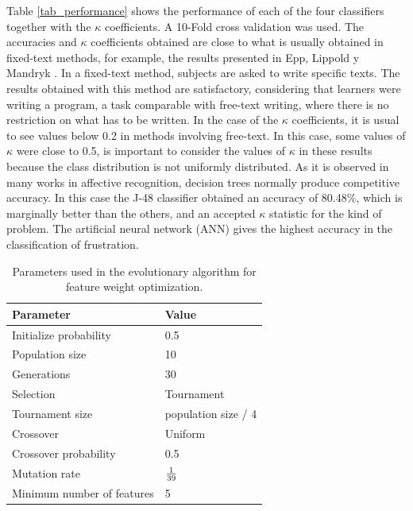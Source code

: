 \documentclass[a4paper,twoside]{article}
\begin{document}
Table \ref{tab_performance} shows the performance of each of the four
classifiers together
with the $\kappa$ coefficients. A 10-Fold cross validation was used.
The accuracies and $\kappa$ coefficients obtained are close to what is
usually obtained in fixed-text methods, for example, the results presented in
Epp, Lippold y Mandryk \cite{epp2011identifying}.
In a fixed-text method, subjects are asked to write specific texts.
The results obtained with this method are satisfactory, considering that
learners were writing a program, a task comparable with free-text writing,
where there is no restriction on what has to be written.
In the case of the $\kappa$ coefficients, it is
usual to see values below 0.2 in methods involving free-text. In this case, some
values of $\kappa$ were close to 0.5, is important to consider the values of $\kappa$
in these results because the class distribution is not uniformly distributed. As
it is observed in many works in affective recognition, decision trees normally
produce competitive accuracy. In this case the J-48 classifier obtained an
accuracy of 80.48\%, which is marginally better than the others, and an accepted $\kappa$
statistic for the kind of problem. The artificial neural network (ANN)
gives the highest
accuracy in the classification of frustration.
%
\begin{table}[h!tb]
\centering
\caption{Parameters used in the evolutionary algorithm for feature
  weight optimization.}
\label{tab_ga_w}
    \begin{tabular}{ | l | l | }
      \hline
      Parameter & Value \\
      \hline
      Initialize probability & 0.5 \\
      Population size & 10 \\
      Generations & 30 \\
      Selection & Tournament \\
      Tournament size & population size / 4 \\
      Crossover & Uniform \\
      Crossover probability & 0.5 \\
      Mutation rate & $1 \over 39$ \\
      Minimum number of features & 5 \\
        \hline
    \end{tabular}
  \end{table}
% 
\end{document}
